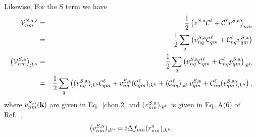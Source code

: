 Likewise,
For the S term we have
\begin{eqnarray}\label{a.3b}
{\mathbf{\cal V}}^{S,\mathrm{a},\ell}_{nm}
&=&
\frac{1}{2}\left(  
v^{S,\mathrm{a}}{\mathbf{\cal C}}^\ell+{\mathbf{\cal C}}^\ell v^{S,\mathrm{a}}
\right)_{nm}
\nonumber\\
&=&
\frac{1}{2}\sum_q\left(  
v^{S,\mathrm{a}}_{nq}{\mathbf{\cal C}}^\ell_{qm}+{\mathbf{\cal C}}^\ell_{nq} v^{S,\mathrm{a}}_{qm}
\right)
\nonumber\\
\left({\mathbf{\cal V}}^{S,\mathrm{a}}_{nm}\right)_{;k^{\mathrm{b}}}
&=&
\frac{1}{2}\sum_q\left(  
v^{S,\mathrm{a}}_{nq}{\mathbf{\cal C}}^\ell_{qm}+{\mathbf{\cal C}}^\ell_{nq} p^{S,\mathrm{a}}_{qm}
\right) _{;k^{\mathrm{b}}}
\nonumber\\
&=&
\frac{1}{2}\sum_q\left(
(v^{S,\mathrm{a}}_{nq})_{;k^{\mathrm{b}}}{\mathbf{\cal C}}^\ell_{qm}
+   
v^{S,\mathrm{a}}_{nq}({\mathbf{\cal C}}^\ell_{qm})_{;k^{\mathrm{b}}}
+
({\mathbf{\cal C}}^\ell_{nq})_{;k^{\mathrm{b}}} v^{S,\mathrm{a}}_{qm}
+
{\mathbf{\cal C}}^\ell_{nq} (v^{S,\mathrm{a}}_{qm})_{;k^{\mathrm{b}}}
\right)
,
\end{eqnarray}   
where $v^{S,\mathrm{a}}_{nm}(\mathbf{k})$ are given in Eq.~\eqref{chon.2}
and
$(v^{S,\mathrm{a}}_{nm})_{;k^{\mathrm{b}}}$ is given in Eq. A(6) of
Ref.~,
\begin{eqnarray}\label{choni.1}
(v^{S,\mathrm{a}}_{nm})_{;k^{\mathrm{b}}}=i\Delta f_{mn}
(r^{\mathrm{a}}_{nm})_{;k^{\mathrm{b}}}
.
\end{eqnarray}

